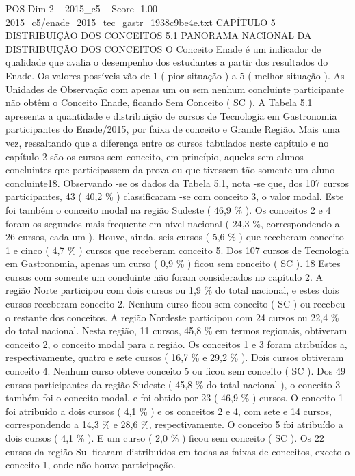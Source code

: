 \begin{textsample}{POS Dim 2 – 2015\_c5 – Score -1.00 – 2015\_c5/enade\_2015\_tec\_gastr\_1938c9be4e.txt}  \label{ex:f2_pos_280}
CAPÍTULO 5 DISTRIBUIÇÃO DOS CONCEITOS 5.1 PANORAMA NACIONAL DA DISTRIBUIÇÃO DOS CONCEITOS O Conceito Enade é um indicador de qualidade que avalia o desempenho dos estudantes a partir dos resultados do Enade.
Os valores possíveis vão de 1 ( pior situação ) a 5 ( melhor situação ).
As Unidades de Observação com apenas um ou sem nenhum concluinte participante não obtêm o Conceito Enade, ficando Sem Conceito ( SC ).
A Tabela 5.1 apresenta a quantidade e distribuição de cursos de Tecnologia em Gastronomia participantes do Enade/2015, por faixa de conceito e Grande Região.
Mais uma vez, ressaltando que a diferença entre os cursos tabulados neste capítulo e no capítulo 2 são os cursos sem conceito, em princípio, aqueles sem alunos concluintes que participassem da prova ou que tivessem tão somente um aluno concluinte18.
Observando -se os dados da Tabela 5.1, nota -se que, dos 107 cursos participantes, 43 ( 40,2 \% ) classificaram -se com conceito 3, o valor modal.
Este foi também o conceito modal na região Sudeste ( 46,9 \% ).
Os conceitos 2 e 4 foram os segundos mais frequente em nível nacional ( 24,3 \%, correspondendo a 26 cursos, cada um ).
Houve, ainda, seis cursos ( 5,6 \% ) que receberam conceito 1 e cinco ( 4,7 \% ) cursos que receberam conceito 5.
Dos 107 cursos de Tecnologia em Gastronomia, apenas um curso ( 0,9 \% ) ficou sem conceito ( SC ). 18 Estes cursos com somente um concluinte não foram considerados no capítulo 2.
A região Norte participou com dois cursos ou 1,9 \% do total nacional, e estes dois cursos receberam conceito 2.
Nenhum curso ficou sem conceito ( SC ) ou recebeu o restante dos conceitos.
A região Nordeste participou com 24 cursos ou 22,4 \% do total nacional.
Nesta região, 11 cursos, 45,8 \% em termos regionais, obtiveram conceito 2, o conceito modal para a região.
Os conceitos 1 e 3 foram atribuídos a, respectivamente, quatro e sete cursos ( 16,7 \% e 29,2 \% ).
Dois cursos obtiveram conceito 4.
Nenhum curso obteve conceito 5 ou ficou sem conceito ( SC ).
Dos 49 cursos participantes da região Sudeste ( 45,8 \% do total nacional ), o conceito 3 também foi o conceito modal, e foi obtido por 23 ( 46,9 \% ) cursos.
O conceito 1 foi atribuído a dois cursos ( 4,1 \% ) e os conceitos 2 e 4, com sete e 14 cursos, correspondendo a 14,3 \% e 28,6 \%, respectivamente.
O conceito 5 foi atribuído a dois cursos ( 4,1 \% ).
E um curso ( 2,0 \% ) ficou sem conceito ( SC ).
Os 22 cursos da região Sul ficaram distribuídos em todas as faixas de conceitos, exceto o conceito 1, onde não houve participação.

\end{textsample}
